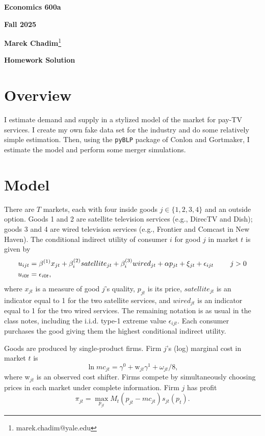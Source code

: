 \documentclass[english,11pt]{article}
\begin{document}
\begin{center}
\textbf{Economics 600a}

\textbf{Fall 2025}

\textbf{Marek Chadim}\footnote[1]{marek.chadim@yale.edu}

\textbf{Homework Solution}

\end{center}

\bigskip

\section{Overview}

I estimate demand and supply in a stylized model of the market for pay-TV services.
I create my own fake data set
for the industry and do some relatively simple estimation. Then, using the \texttt{pyBLP} package of Conlon and Gortmaker, I estimate the model and perform some merger simulations.

\section{Model}

There are $T$ markets, each with four inside goods $j\in
\{1,2,3,4\}$ and an outside option. Goods 1 and 2 are satellite television
services (e.g., DirecTV and Dish); goods 3 and 4 are wired television
services (e.g., Frontier and Comcast in New Haven).
The conditional indirect utility of consumer $i$ for good $j$ in market $t$
is given by
\begin{align*}
u_{ijt}& =\beta ^{\left( 1\right) }x_{jt}+\beta
_{i}^{(2)}satellite_{jt}+\beta _{i}^{(3)}wired_{jt}+\alpha p_{jt}+\xi
_{jt}+\epsilon _{ijt}\text{ \qquad }j>0 \\
u_{i0t}& =\epsilon _{i0t},
\end{align*}%
where $x_{jt}$ is a measure of good $j$'s quality, $p_{jt}$ is its price, $%
satellite_{jt}$ is an indicator equal to 1 for the two satellite services,
and $wired_{jt}$ is an indicator equal to 1 for the two wired services. The
remaining notation is as usual in the class notes, including the i.i.d.
type-1 extreme value $\epsilon _{ijt}$.  Each consumer purchases the good giving them the highest conditional indirect utility.

Goods are produced by single-product firms. Firm $j$'s (log) marginal
cost in market $t$ is 
\begin{equation*}
\ln mc_{jt}=\gamma ^{0}+\text{w}_{jt}\gamma ^{1}+\omega _{jt}/8,
\end{equation*}%
where w$_{jt}$ is an observed cost shifter. Firms compete by simultaneously choosing prices in each market under complete information. Firm $j$ has profit
\begin{equation*}
\pi _{jt}=\max_{p_{jt}}M_{t}(p_{jt}-mc_{jt})s_{jt}(p_{t}).
\end{equation*}
\end{document}
